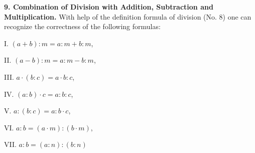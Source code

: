 \vspace{0.1cm}
\textbf{9. Combination of Division with Addition, Subtraction and Multiplication.} With help of the definition formula of division (No. 8) one can recognize the correctness of the following formulas:

I. $(\textit{a} + \textit{b}):\textit{m} = \textit{a}:\textit{m} + \textit{b}:\textit{m}$, \quad 

II. $(\textit{a} - \textit{b}):\textit{m} = \textit{a}:\textit{m} - \textit{b}:\textit{m}$, \quad 

III. $\textit{a} \cdot (\textit{b}:\textit{c}) = \textit{a} \cdot \textit{b}:\textit{c}$,


IV. $(\textit{a}:\textit{b}) \cdot \textit{c} = \textit{a}:\textit{b}:\textit{c}$, \quad 

V. $\textit{a}:(\textit{b}:\textit{c}) = \textit{a}:\textit{b} \cdot \textit{c}$, \quad 

VI. $\textit{a}:\textit{b} = (\textit{a} \cdot \textit{m}):(\textit{b} \cdot \textit{m})$, \quad 

VII. $\textit{a}:\textit{b} = (\textit{a}:\textit{n}):(\textit{b}:\textit{n})$


